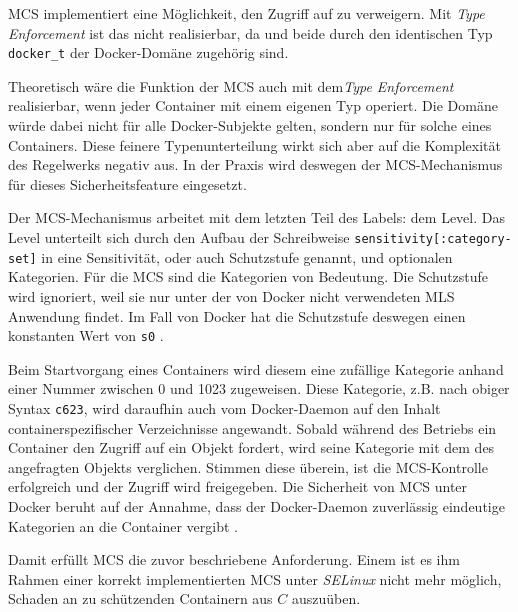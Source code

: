 \documentclass[../main.tex]{subfiles}
\begin{document}
					MCS implementiert eine Möglichkeit, \cbroken{} den Zugriff auf \cvalid zu verweigern. Mit \emph{Type Enforcement} ist das nicht realisierbar, da \cbroken{} und \cvalid{} beide durch den identischen Typ \texttt{docker\_t} der Docker-Domäne zugehörig sind.

					Theoretisch wäre die Funktion der MCS auch mit dem\emph{Type Enforcement} realisierbar, wenn jeder Container mit einem eigenen Typ operiert. Die Domäne würde dabei nicht für alle Docker-Subjekte gelten, sondern nur für solche eines Containers. Diese feinere Typenunterteilung wirkt sich aber auf die Komplexität des Regelwerks negativ aus. In der Praxis wird deswegen der MCS-Mechanismus für dieses Sicherheitsfeature eingesetzt.


					Der MCS-Mechanismus arbeitet mit dem letzten Teil des Labels: dem Level. Das Level unterteilt sich durch den Aufbau der Schreibweise \texttt{sensitivity[:category-set]} in eine Sensitivität, oder auch Schutzstufe genannt, und optionalen Kategorien. Für die MCS sind die Kategorien von Bedeutung. Die Schutzstufe wird ignoriert, weil sie nur unter der von Docker nicht verwendeten \acrshort{MLS} Anwendung findet. Im Fall von Docker hat die Schutzstufe deswegen einen konstanten Wert von \texttt{s0} \cite{selinuxRedhatMCS}\cite{selinuxRedhatMCS}.

					Beim Startvorgang eines Containers wird diesem eine zufällige Kategorie anhand einer Nummer zwischen 0 und 1023 zugeweisen. Diese Kategorie, z.B. nach obiger Syntax \texttt{c623}, wird daraufhin auch vom Docker-Daemon auf den Inhalt containerspezifischer Verzeichnisse angewandt. Sobald während des Betriebs ein Container den Zugriff auf ein Objekt fordert, wird seine Kategorie mit dem des angefragten Objekts verglichen. Stimmen diese überein, ist die MCS-Kontrolle erfolgreich und der Zugriff wird freigegeben. Die Sicherheit von MCS unter Docker beruht auf der Annahme, dass der Docker-Daemon zuverlässig eindeutige Kategorien an die Container vergibt \cite[S.200f.]{learningDocker}.



					Damit erfüllt MCS die zuvor beschriebene Anforderung. Einem \cbroken{} ist es ihm Rahmen einer korrekt implementierten MCS unter \emph{SELinux} nicht mehr möglich, Schaden an zu schützenden Containern aus \(C\) auszuüben.
\end{document}
